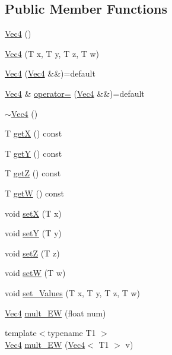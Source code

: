 \subsection*{Public Member Functions}
\begin{DoxyCompactItemize}
\item 
\mbox{\hyperlink{class_vec4_ad342af37b73f64d7cea0cef986f5c959}{Vec4}} ()
\item 
\mbox{\hyperlink{class_vec4_adcfec79e821f101e76ff6bc39f170b3b}{Vec4}} (T x, T y, T z, T w)
\item 
\mbox{\hyperlink{class_vec4_a6c58c1104701d83123df793b4286b03a}{Vec4}} (\mbox{\hyperlink{class_vec4}{Vec4}} \&\&)=default
\item 
\mbox{\hyperlink{class_vec4}{Vec4}} \& \mbox{\hyperlink{class_vec4_a351bc33888f0a3008b90f83c028cdf8a}{operator=}} (\mbox{\hyperlink{class_vec4}{Vec4}} \&\&)=default
\item 
\mbox{\hyperlink{class_vec4_a0c2e1161cc05cc200b4b14affb48279d}{$\sim$\+Vec4}} ()
\item 
T \mbox{\hyperlink{class_vec4_ac99f7d2425b140e008a4d3eb3c6ac279}{getX}} () const
\item 
T \mbox{\hyperlink{class_vec4_aa75327d1d4c22bea8ce2857708ed2b72}{getY}} () const
\item 
T \mbox{\hyperlink{class_vec4_a21606d1d8d9adb1d2140f080fe1c6340}{getZ}} () const
\item 
T \mbox{\hyperlink{class_vec4_a2521cd3acaff1d2f08db0d0cbf99b41d}{getW}} () const
\item 
void \mbox{\hyperlink{class_vec4_a9f4e3566a9d832a0b1de1e6dbd9c6dbd}{setX}} (T x)
\item 
void \mbox{\hyperlink{class_vec4_a61084f24df2d63808656dc0a038a0ed7}{setY}} (T y)
\item 
void \mbox{\hyperlink{class_vec4_aaa54409c9cea008742d4fd28a8a1b8d9}{setZ}} (T z)
\item 
void \mbox{\hyperlink{class_vec4_ad347e47a5371a8663d6b19c3bfaf4154}{setW}} (T w)
\item 
void \mbox{\hyperlink{class_vec4_a4c670bb938d2274701f7d5764ac68fb8}{set\+\_\+\+Values}} (T x, T y, T z, T w)
\item 
\mbox{\hyperlink{class_vec4}{Vec4}} \mbox{\hyperlink{class_vec4_ae00aafd1981b6ae5b1bbf428c4bf9570}{mult\+\_\+\+EW}} (float num)
\item 
{\footnotesize template$<$typename T1 $>$ }\\\mbox{\hyperlink{class_vec4}{Vec4}} \mbox{\hyperlink{class_vec4_a50a2bc68e9d9093a5151577d4cacc4e8}{mult\+\_\+\+EW}} (\mbox{\hyperlink{class_vec4}{Vec4}}$<$ T1 $>$ v)

\end{DoxyCompactItemize}
